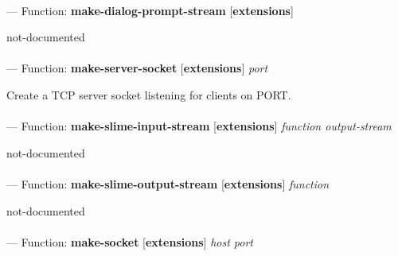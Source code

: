 \paragraph{}
\label{EXTENSIONS:MAKE-DIALOG-PROMPT-STREAM}
--- Function: \textbf{make-dialog-prompt-stream} [\textbf{extensions}] \textit{}

\begin{adjustwidth}{5em}{5em}
not-documented
\end{adjustwidth}

\paragraph{}
\label{EXTENSIONS:MAKE-SERVER-SOCKET}
--- Function: \textbf{make-server-socket} [\textbf{extensions}] \textit{port}

\begin{adjustwidth}{5em}{5em}
Create a TCP server socket listening for clients on PORT.
\end{adjustwidth}

\paragraph{}
\label{EXTENSIONS:MAKE-SLIME-INPUT-STREAM}
--- Function: \textbf{make-slime-input-stream} [\textbf{extensions}] \textit{function output-stream}

\begin{adjustwidth}{5em}{5em}
not-documented
\end{adjustwidth}

\paragraph{}
\label{EXTENSIONS:MAKE-SLIME-OUTPUT-STREAM}
--- Function: \textbf{make-slime-output-stream} [\textbf{extensions}] \textit{function}

\begin{adjustwidth}{5em}{5em}
not-documented
\end{adjustwidth}

\paragraph{}
\label{EXTENSIONS:MAKE-SOCKET}
--- Function: \textbf{make-socket} [\textbf{extensions}] \textit{host port}

